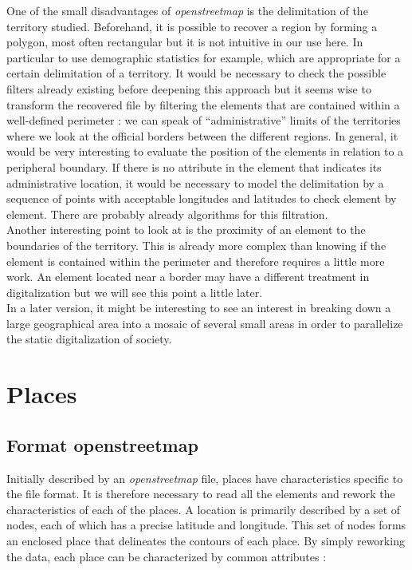 One of the small disadvantages of \textit{openstreetmap} is the delimitation of the territory studied. Beforehand, it is possible to recover a region by forming a polygon, most often rectangular but it is not intuitive in our use here. In particular to use demographic statistics for example, which are appropriate for a certain delimitation of a territory. It would be necessary to check the possible filters already existing before deepening this approach but it seems wise to transform the recovered file by filtering the elements that are contained within a well-defined perimeter : we can speak of ``administrative'' limits of the territories where we look at the official borders between the different regions. In general, it would be very interesting to evaluate the position of the elements in relation to a peripheral boundary. If there is no attribute in the element that indicates its administrative location, it would be necessary to model the delimitation by a sequence of points with acceptable longitudes and latitudes to check element by element. There are probably already algorithms for this filtration.\\

Another interesting point to look at is the proximity of an element to the boundaries of the territory. This is already more complex than knowing if the element is contained within the perimeter and therefore requires a little more work. An element located near a border may have a different treatment in digitalization but we will see this point a little later.\\

In a later version, it might be interesting to see an interest in breaking down a large geographical area into a mosaic of several small areas in order to parallelize the static digitalization of society.\\

\newpage

\section{Places}

\subsection{Format openstreetmap}

Initially described by an \textit{openstreetmap} file, places have characteristics specific to the file format. It is therefore necessary to read all the elements and rework the characteristics of each of the places. A location is primarily described by a set of nodes, each of which has a precise latitude and longitude. This set of nodes forms an enclosed place that delineates the contours of each place. By simply reworking the data, each place can be characterized by common attributes : \\


